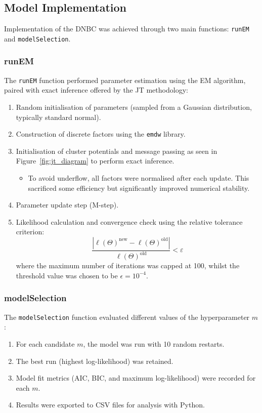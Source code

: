 \subsection{Model Implementation}
Implementation of the DNBC was achieved through two main functions: \texttt{runEM} and \texttt{modelSelection}.

\subsubsection*{runEM}
The \texttt{runEM} function performed parameter estimation using the EM algorithm, paired with exact inference offered by the JT methodology:
\begin{enumerate}
    \item Random initialisation of parameters (sampled from a Gaussian distribution, typically standard normal).
    \item Construction of discrete factors using the \texttt{emdw} library.
    \item Initialisation of cluster potentials and message passing as seen in Figure~\ref{fig:jt_diagram} to perform exact inference.
          \begin{itemize}
              \item To avoid underflow, all factors were normalised after each update. This sacrificed some efficiency but significantly improved numerical stability.
          \end{itemize}
    \item Parameter update step (M-step).
    \item Likelihood calculation and convergence check using the relative tolerance criterion:
    \[
        \frac{|\ell(\Theta)^{\text{new}} - \ell(\Theta)^{\text{old}}|}{\ell(\Theta)^{\text{old}}} < \varepsilon
    \]
        where the maximum number of iterations was capped at 100, whilst the threshold value was chosen to be $\epsilon = 10^{-4}$.
\end{enumerate}

\subsubsection*{modelSelection}
The \texttt{modelSelection} function evaluated different values of the hyperparameter $m$:
\begin{enumerate}
    \item For each candidate $m$, the model was run with 10 random restarts.
    \item The best run (highest log-likelihood) was retained.
    \item Model fit metrics (AIC, BIC, and maximum log-likelihood) were recorded for each $m$.
    \item Results were exported to CSV files for analysis with Python.
\end{enumerate}


